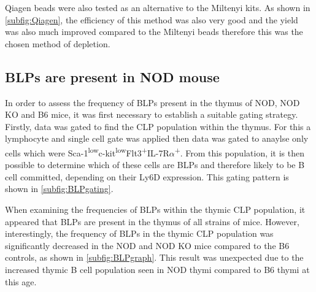 	
	

Qiagen beads were also tested as an alternative to the Miltenyi kits. 
As shown in \cref{subfig:Qiagen}, the efficiency of this method was also very good and the yield was also much improved compared to the Miltenyi beads therefore this was the chosen method of depletion.


\subsection{BLPs are present in NOD mouse}

In order to assess the frequency of BLPs present in the thymus of NOD, NOD KO and B6 mice, it was first necessary to establish a suitable gating strategy.
Firstly, data was gated to find the CLP population within the thymus.
For this a lymphocyte and single cell gate was applied then data was gated to anaylse only cells which were Sca-1\textsuperscript{low}c-kit\textsuperscript{low}Flt3\textsuperscript{+}IL-7R$\alpha$\textsuperscript{+}.
From this population, it is then possible to determine which of these cells are BLPs and therefore likely to be B cell committed, depending on their Ly6D expression.
This gating pattern is shown in \cref{subfig:BLPgating}.

When examining the frequencies of BLPs within the thymic CLP population, it appeared that BLPs are present in the thymus of all strains of mice.
However, interestingly, the frequency of BLPs in the thymic CLP population was significantly decreased in the NOD and NOD KO mice compared to the B6 controls, as shown in \cref{subfig:BLPgraph}.
This result was unexpected due to the increased thymic B cell population seen in NOD thymi compared to B6 thymi at this age.

